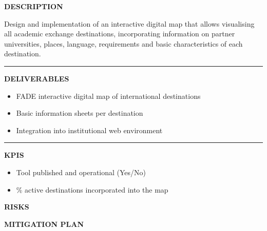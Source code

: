 \documentclass[11pt,a4paper]{scrreprt}
\newcommand{\fieldlabel}[1]{%
  {\footnotesize\sffamily\bfseries\color{mutedcolor}\MakeUppercase{#1}}\par\nopagebreak[4]
}
\newcommand{\fieldsep}{\vspace{3pt}\noindent\textcolor{bordercolor}{\rule{\linewidth}{0.4pt}}\vspace{3pt}\par}
\begin{document}
\begin{tcolorbox}[pabox={fgcolor}{A.P.1.1 \enspace\textbullet\enspace Development of an Interactive Map with Available Destinations}]

\fieldlabel{Description}
{\small Design and implementation of an interactive digital map that allows visualising all academic exchange destinations, incorporating information on partner universities, places, language, requirements and basic characteristics of each destination.}\par
\fieldsep
\fieldlabel{Deliverables}
{\small \begin{itemize}[noitemsep,topsep=2pt]
\item FADE interactive digital map of international destinations
\item Basic information sheets per destination
\item Integration into institutional web environment
\end{itemize}}\par
\fieldsep
\fieldlabel{KPIs}
{\small \begin{itemize}[noitemsep,topsep=2pt]
\item Tool published and operational (Yes/No)
\item \% active destinations incorporated into the map
\end{itemize}}\par
\end{tcolorbox}
\begin{tcolorbox}[riskbox]
{\footnotesize\sffamily\bfseries\color{red!50!black} RISKS}\par{}
\end{tcolorbox}
\begin{tcolorbox}[mitbox]
{\footnotesize\sffamily\bfseries\color{green!40!black} MITIGATION PLAN}\par{}
\end{tcolorbox}
\vspace{8pt}
\end{document}
